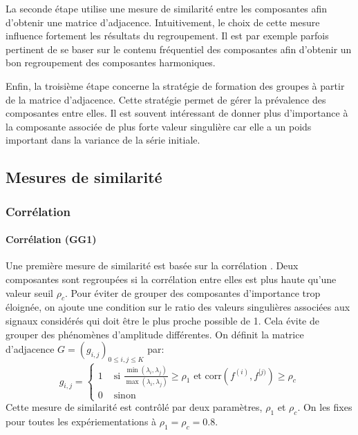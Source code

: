 \documentclass{gretsi}
\begin{document}
La seconde étape utilise une mesure de similarité entre les composantes afin d'obtenir une matrice d'adjacence. Intuitivement, le choix de cette mesure influence fortement les résultats du regroupement. Il est par exemple parfois pertinent de se  baser sur le contenu fréquentiel des composantes afin d'obtenir un bon regroupement des composantes harmoniques.

Enfin, la troisième étape concerne la stratégie de formation des groupes à partir de la matrice d'adjacence. Cette stratégie permet de gérer la prévalence des composantes entre elles. Il est souvent intéressant de donner plus d'importance à la composante associée de plus forte valeur singulière car elle a un poids important dans la variance de la série initiale.


\subsection{Mesures de similarité}
\label{sub:sim}

\subsubsection{Corrélation}\label{ssub:cor}
\paragraph{Corrélation (GG1)}\label{par:GG1}
    Une première mesure de similarité est basée sur la corrélation \cite{abalov_14_auto}. Deux composantes sont regroupées si la corrélation entre elles est plus haute qu'une valeur seuil $\rho_c$. Pour éviter de grouper des composantes d'importance trop éloignée, on ajoute une condition sur le ratio des valeurs singulières associées aux signaux considérés qui doit être  le plus proche possible de 1. Cela évite de grouper des phénomènes d'amplitude différentes. On définit la matrice d'adjacence $G = (g_{i, j})_{0 \le i,j\le K}$ par:
    $$
    g_{i, j} = \begin{cases}
	    1 &\text{ si } \displaystyle\frac{\min(\lambda_i, \lambda_j)}{\max(\lambda_i, \lambda_j)} \ge \rho_1 \text{ et } \text{corr}(f^{(i)}, f^{[j)}) \ge \rho_c\\
	    0& \text{ sinon}
    \end{cases}
    $$Cette mesure de similarité est contrôlé par deux paramètres, $\rho_1$ et $\rho_c$. On les fixes pour toutes les expériementations à $\rho_1=\rho_c=0.8$.
\end{document}
